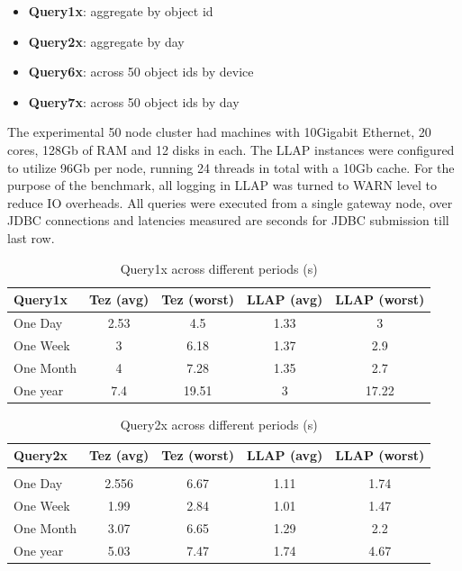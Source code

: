 \begin{itemize}
\item \textbf{Query1x}: aggregate by object id
\item \textbf{Query2x}: aggregate by day
\item \textbf{Query6x}: across 50 object ids by device
\item \textbf{Query7x}: across 50 object ids by day
\end{itemize}

The experimental 50 node cluster had machines with 10Gigabit Ethernet, 20 cores, 128Gb of RAM and 12 disks in each. The LLAP instances
were configured to utilize 96Gb per node, running 24 threads in total with a 10Gb cache. For the purpose of the benchmark, all logging
in LLAP was turned to WARN level to reduce IO overheads. All queries were executed from a single gateway node, over JDBC connections 
and latencies measured are seconds for JDBC submission till last row.

\iffalse
\begin{table}[h]
\begin{tabular}{l|*{4}c}
Query1x  &   Tez (avg)  &   Tez (worst)  &   LLAP (avg)  &   LLAP (worst) \\
\hline
One Day  &   2.53  &   4.5  &   1.33  &   3 \\
One Week  &   3  &   6.18  &   1.37  &   2.9 \\
One Month  &   4  &   7.28  &   1.35  &   2.7 \\
One year  &   7.4  &   19.51  &   3  &   17.22 \\
\end{tabular}
\caption{Query1x across different periods (s)}
\end{table}

\begin{table}[h]
\begin{tabular}{l|*{4}c}
Query2x  &   Tez (avg)  &   Tez (worst)  &   LLAP (avg)  &   LLAP (worst) \\
\hline \\
One Day  &   2.556  &   6.67  &   1.11  &   1.74 \\
One Week  &   1.99  &   2.84  &   1.01  &   1.47 \\
One Month  &   3.07  &   6.65  &   1.29  &   2.2 \\
One year  &   5.03  &   7.47  &   1.74  &   4.67 \\
\end{tabular}
\caption{Query2x across different periods (s)}
\end{table}

